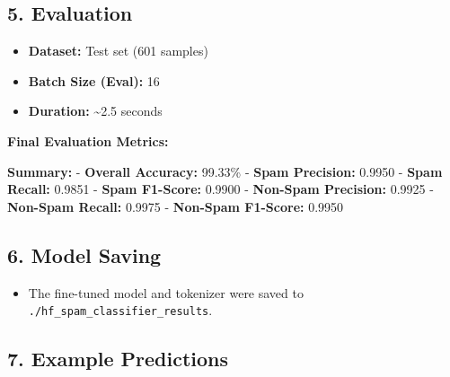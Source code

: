 \documentclass[a4paper,10pt]{article}
\begin{document}
\subsection{5. Evaluation}\label{evaluation}

\begin{itemize}
\tightlist
\item
  \textbf{Dataset:} Test set (601 samples)
\item
  \textbf{Batch Size (Eval):} 16
\item
  \textbf{Duration:} \textasciitilde2.5 seconds
\end{itemize}

\textbf{Final Evaluation Metrics:}

\begin{Shaded}
\begin{Highlighting}[]
\end{Highlighting}
\end{Shaded}

\textbf{Summary:} - \textbf{Overall Accuracy:} 99.33\% - \textbf{Spam
Precision:} 0.9950 - \textbf{Spam Recall:} 0.9851 - \textbf{Spam
F1-Score:} 0.9900 - \textbf{Non-Spam Precision:} 0.9925 -
\textbf{Non-Spam Recall:} 0.9975 - \textbf{Non-Spam F1-Score:} 0.9950

\subsection{6. Model Saving}\label{model-saving}

\begin{itemize}
\tightlist
\item
  The fine-tuned model and tokenizer were saved to
  \texttt{./hf\_spam\_classifier\_results}.
\end{itemize}

\subsection{7. Example Predictions}\label{example-predictions}
\end{document}
